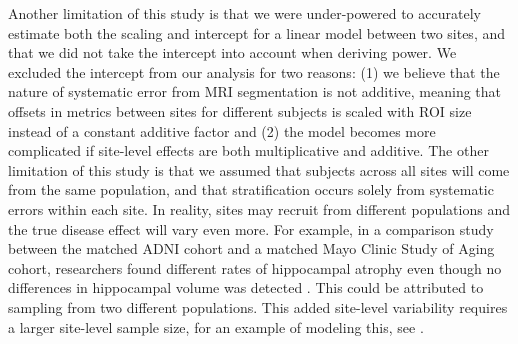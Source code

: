 Another limitation of this study is that we were under-powered to accurately estimate both the scaling and intercept for a linear model between two sites, and that we did not take the intercept into account when deriving power. We excluded the intercept from our analysis for two reasons: (1) we believe that the nature of systematic error from MRI segmentation is not additive, meaning that offsets in metrics between sites for different subjects is scaled with ROI size instead of a constant additive factor and (2) the model becomes more complicated if site-level effects are both multiplicative and additive. The other limitation of this study is that we assumed that subjects across all sites will come from the same population, and that stratification occurs solely from systematic errors within each site. In reality, sites may recruit from different populations and the true disease effect will vary even more. For example, in a comparison study between the matched ADNI cohort and a matched Mayo Clinic Study of Aging cohort, researchers found different rates of hippocampal atrophy even though no differences in hippocampal volume was detected \cite{Whitwell_2012}. This could be attributed to sampling from two different populations. This added site-level variability requires a larger site-level sample size, for an example of modeling this, see \cite{enigmarandom}. 

